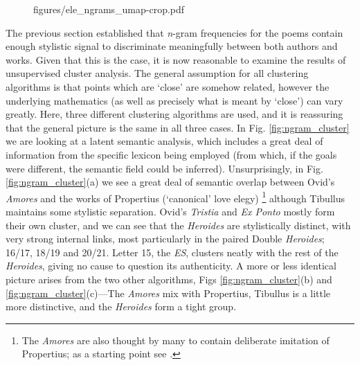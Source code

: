 \documentclass[twocolumn, switch, a4paper]{article} %
\begin{document}
\begin{figure}
{    {figures/ele_ngrams_umap-crop.pdf}
  }
\end{figure}

The previous section established that \emph{n}-gram frequencies for the poems
contain enough stylistic signal to discriminate meaningfully between both
authors and works. Given that this is the case, it is now reasonable to
examine the results of unsupervised cluster analysis. The general assumption
for all clustering algorithms is that points which are `close' are somehow
related, however the underlying mathematics (as well as precisely what is
meant by `close') can vary greatly. Here, three different clustering
algorithms are used, and it is reassuring that the general picture is the same
in all three cases. In Fig. \ref{fig:ngram_cluster} we are looking at a latent
semantic analysis, which includes a great deal of information from the
specific lexicon being employed (from which, if the goals were different, the
semantic field could be inferred). Unsurprisingly, in Fig.
\ref{fig:ngram_cluster}(a) we see a great deal of semantic overlap between
Ovid's \emph{Amores} and the works of Propertius (`canonical' love elegy)%
%
    \footnote{The \emph{Amores} are also thought by many to contain deliberate
    imitation of Propertius; as a starting point see .}
%
although Tibullus maintains some stylistic separation. Ovid's \emph{Tristia}
and \emph{Ex Ponto} mostly form their own cluster, and we can see that the
\emph{Heroides} are stylistically distinct, with very strong internal links,
most particularly in the paired Double \emph{Heroides}; 16/17, 18/19 and
20/21. Letter 15, the \emph{ES}, clusters neatly with the rest of the
\emph{Heroides}, giving no cause to question its authenticity. A more or less
identical picture arises from the two other algorithms, Figs
\ref{fig:ngram_cluster}(b) and \ref{fig:ngram_cluster}(c)---The \emph{Amores}
mix with Propertius, Tibullus is a little more distinctive, and the
\emph{Heroides} form a tight group.
\end{document}
